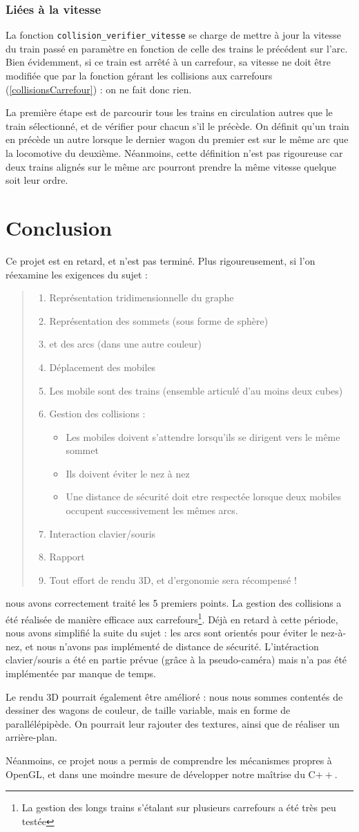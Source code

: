 \documentclass[a4paper, oneside, 11pt, twocolumn]{article}
\newcommand{\sujet}{
\begin{quotation}
  \noindent
  \begin{enumerate}
  \item Représentation tridimensionnelle du graphe
  \item Représentation des sommets (sous forme de sphère)
  \item et des arcs (dans une autre couleur)
  \item Déplacement des mobiles
  \item Les mobile sont des trains (ensemble articulé d’au moins deux cubes)
  \item Gestion des collisions :
    \begin{itemize}
    \item Les mobiles doivent s’attendre lorsqu’ils se dirigent vers le même sommet
    \item Ils doivent éviter le nez à nez
    \item Une distance de sécurité doit etre respectée lorsque deux mobiles occupent successivement les
      mêmes arcs.
    \end{itemize}
  \item Interaction clavier/souris
  \item Rapport
  \item Tout effort de rendu 3D, et d’ergonomie sera récompensé !
  \end{enumerate}
\end{quotation}
}
\begin{document}
\subsubsection{Liées à la vitesse}
\label{collisionsVitesse}

La fonction \texttt{collision\_verifier\_vitesse} se charge de mettre à jour la vitesse du train passé en paramètre en fonction de celle des trains le précédent sur l'arc. Bien évidemment, si ce train est arrêté à un carrefour, sa vitesse ne doit être modifiée que par la fonction gérant les collisions aux carrefours (\ref{collisionsCarrefour}) : on ne fait donc rien.

La première étape est de parcourir tous les trains en circulation autres que le train sélectionné, et de vérifier pour chacun s'il le précède. On définit qu'un train en précède un autre lorsque le dernier wagon du premier est sur le même arc que la locomotive du deuxième. Néanmoins, cette définition n'est pas rigoureuse car deux trains alignés sur le même arc pourront prendre la même vitesse quelque soit leur ordre.

\section{Conclusion}

Ce projet est en retard, et n'est pas terminé. Plus rigoureusement, si l'on réexamine les exigences du sujet :

\sujet

nous avons correctement traité les 5 premiers points. La gestion des collisions a été réalisée de manière efficace aux carrefours\footnote{La gestion des longs trains s'étalant sur plusieurs carrefours a été très peu testée}. Déjà en retard à cette période, nous avons simplifié la suite du sujet : les arcs sont orientés pour éviter le nez-à-nez, et nous n'avons pas implémenté de distance de sécurité. L'intéraction clavier/souris a été en partie prévue (grâce à la pseudo-caméra) mais n'a pas été implémentée par manque de temps.

Le rendu 3D pourrait également être amélioré : nous nous sommes contentés de dessiner des wagons de couleur, de taille variable, mais en forme de parallélépipède. On pourrait leur rajouter des textures, ainsi que de réaliser un arrière-plan.

Néanmoins, ce projet nous a permis de comprendre les mécanismes propres à OpenGL, et dans une moindre mesure de développer notre maîtrise du C$++$.
\end{document}
